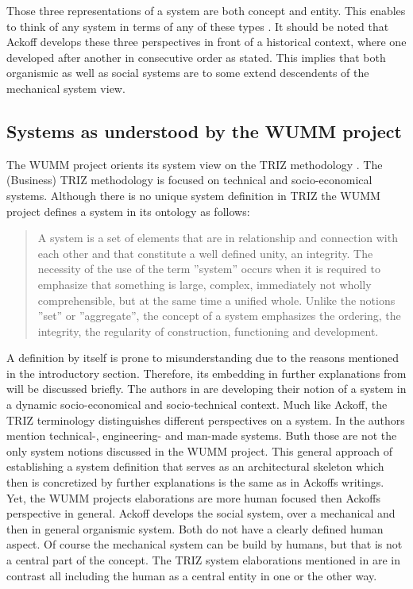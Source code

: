 \documentclass[a4paper,11pt]{article}
\begin{document}
Those three representations of a system are both concept and entity. This
enables to think of any system in terms of any of these types
\cite{ackoff1994systems}.  It should be noted that Ackoff develops these three
perspectives in front of a historical context, where one developed after
another in consecutive order as stated. This implies that both organismic as
well as social systems are to some extend descendents of the mechanical system
view.

\subsection{Systems as understood by the WUMM project}%
\label{sec:systems_as_understood_by_the_wumm_project}

The WUMM project orients its system view on the TRIZ methodology
\cite{altshuller200240}. The (Business) TRIZ methodology is focused on
technical and socio-economical systems. Although there is no unique system
definition in TRIZ the WUMM project defines a system in its ontology
\cite{triz_system} as follows:
\begin{quote}
  A system is a set of elements that are in relationship and connection with
  each other and that constitute a well defined unity, an integrity. The
  necessity of the use of the term ”system” occurs when it is required to
  emphasize that something is large, complex, immediately not wholly
  comprehensible, but at the same time a unified whole. Unlike the notions
  ”set” or ”aggregate”, the concept of a system emphasizes the ordering, the
  integrity, the regularity of construction, functioning and development.
\end{quote}	

A definition by itself is prone to misunderstanding due to the reasons
mentioned in the introductory section. Therefore, its embedding in further
explanations from \cite{grabe2020seminar} will be discussed briefly.  The
authors in \cite{grabe2020seminar} are developing their notion of a system in
a dynamic socio-economical and socio-technical context. Much like Ackoff, the
TRIZ terminology distinguishes different perspectives on a system. In
\cite[p.~69]{grabe2020seminar} the authors mention technical-, engineering-
and man-made systems. Buth those are not the only system notions discussed in
the WUMM project.  This general approach of establishing a system definition
that serves as an architectural skeleton which then is concretized by further
explanations is the same as in Ackoffs writings. Yet, the WUMM projects
elaborations are more human focused then Ackoffs perspective in general.
Ackoff develops the social system, over a mechanical and then in general
organismic system. Both do not have a clearly defined human aspect. Of course
the mechanical system can be build by humans, but that is not a central part
of the concept. The TRIZ system elaborations mentioned in
\cite[p.~69]{grabe2020seminar} are in contrast all including the human as a
central entity in one or the other way.
\end{document}
